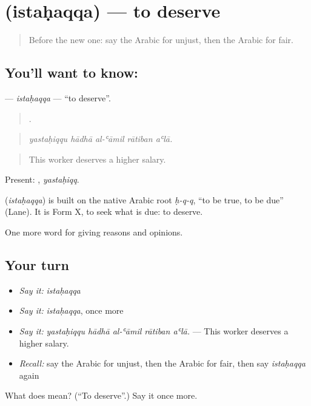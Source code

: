 \section[\texorpdfstring{\ar{استحق} (istaḥaqqa)}{استحق (istaḥaqqa)}]{ (istaḥaqqa) — to deserve}

\label{lesson:AR-C380-istahaqqa}



\begin{quote}
Before the new one: say the Arabic for unjust, then the Arabic for fair.
\end{quote}

\subsection*{You'll want to know: }
\textbf{} — \emph{istaḥaqqa} — \textquotedblleft{}to deserve\textquotedblright{}.

\begin{quote}
    .
\end{quote}

\begin{quote}
\emph{yastaḥiqqu hādhā al-ʿāmil rātiban aʿlā.}
\end{quote}

\begin{quote}
This worker deserves a higher salary.
\end{quote}

Present: , \emph{yastaḥiqq}.

\begin{cousinweb}
\textbf{} (\emph{istaḥaqqa}) is built on the native Arabic root \emph{ḥ-q-q}, \textquotedblleft{}to be true, to be due\textquotedblright{} (Lane). It is Form X, to seek what is due: to deserve.
\end{cousinweb}

\begin{grammarlens}[title={What you've built}]
One more word for giving reasons and opinions.
\end{grammarlens}

\subsection*{Your turn}
\begin{itemize}
\raggedright
  \item \emph{Say it:} \emph{istaḥaqqa}
  \item \emph{Say it:} \emph{istaḥaqqa}, once more
  \item \emph{Say it:} \emph{yastaḥiqqu hādhā al-ʿāmil rātiban aʿlā.} — This worker deserves a higher salary.
  \item \emph{Recall:} say the Arabic for unjust, then the Arabic for fair, then say \emph{istaḥaqqa} again
\end{itemize}

\begin{tcolorbox}[breakable,colback=teal!4,colframe=teal!35!black,title={Before you move on}]
What does  mean? (\textquotedblleft{}To deserve\textquotedblright{}.) Say it once more.
\end{tcolorbox}

